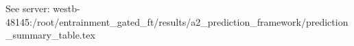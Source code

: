 See server: westb-48145:/root/entrainment_gated_ft/results/a2_prediction_framework/prediction_summary_table.tex